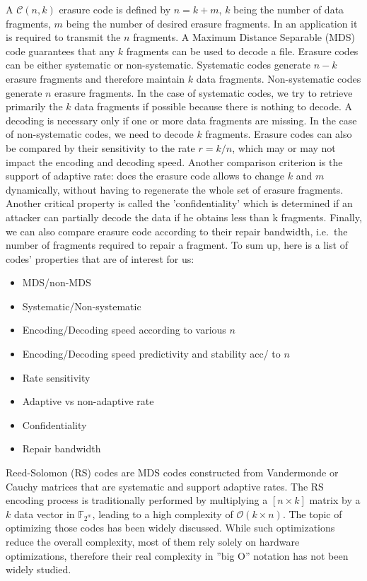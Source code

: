 \documentclass[oneside,9pt]{article}
\newcommand{\bigo}[1]{ \mathcal{O}(#1) }
\newcommand{\ec}[2]{ \mathcal{C}(#1, #2) }
\newcommand{\gf}[2][]{ \mathbb{F}_{{#2}^{#1}} }
\begin{document}
A {$\ec{n}{k}$} erasure code is defined by $n=k+m$, $k$ being the number of data fragments, $m$ being the number of desired erasure fragments. In an application it is required to transmit the $n$ fragments. A Maximum Distance Separable (MDS) code guarantees that any $k$ fragments can be used to decode a file. Erasure codes can be either systematic or non-systematic. Systematic codes generate $n-k$ erasure fragments and therefore maintain $k$ data fragments. Non-systematic codes generate $n$ erasure fragments. In the case of systematic codes, we try to retrieve primarily the $k$ data fragments if possible because there is nothing to decode. A decoding is necessary only if one or more data fragments are missing. In the case of non-systematic codes, we need to decode $k$ fragments. Erasure codes can also be compared by their sensitivity to the rate $r=k/n$, which may or may not impact the encoding and decoding speed. Another comparison criterion is the support of adaptive rate: does the erasure code allows to change $k$ and $m$ dynamically, without having to regenerate the whole set of erasure fragments. Another critical property is called the 'confidentiality' \cite{li_confidentiality} which is determined if an attacker can partially decode the data if he obtains less than k fragments. Finally, we can also compare erasure code according to their repair bandwidth, i.e.\ the number of fragments required to repair a fragment. To sum up, here is a list of codes' properties that are of interest for us:
\begin{itemize}
\item MDS/non-MDS
\item Systematic/Non-systematic
\item Encoding/Decoding speed according to various $n$
\item Encoding/Decoding speed predictivity and stability acc/ to $n$
\item Rate sensitivity
\item Adaptive vs non-adaptive rate
\item Confidentiality
\item Repair bandwidth
\end{itemize}

Reed-Solomon (RS) codes are MDS codes constructed from Vandermonde or Cauchy matrices \cite{reed_sol} that are systematic and support adaptive rates. The RS encoding process is traditionally performed by multiplying a $[n \times k]$ matrix by a $k$ data vector in $\gf{2^w}$, leading to a high complexity of $\bigo{k \times n}$. The topic of optimizing those codes has been widely discussed. While such optimizations reduce the overall complexity, most of them rely solely on hardware optimizations, therefore their real complexity in ''big O'' notation has not been widely studied.
% 
% 
\end{document}
